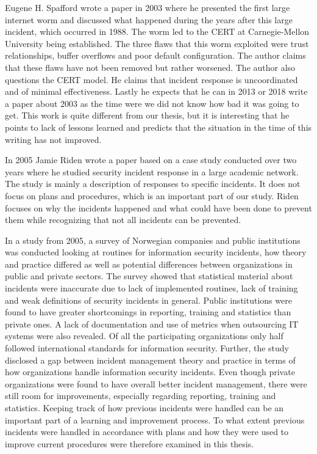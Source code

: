 Eugene H. Spafford \cite{spafford2003failure} wrote a paper in 2003 where he presented the first large internet worm and discussed what happened during the years after this large incident, which occurred in 1988. The worm led to the CERT at Carnegie-Mellon University being established. The three flaws that this worm exploited were trust relationships, buffer overflows and poor default configuration. The author claims that these flaws have not been removed but rather worsened. The author also questions the CERT model. He claims that incident response is uncoordinated and of minimal effectiveness. Lastly he expects that he can in 2013 or 2018 write a paper about 2003 as the time were we did not know how bad it was going to get. This work is quite different from our thesis, but it is interesting that he points to lack of lessons learned and predicts that the situation in the time of this writing has not improved.

In 2005 Jamie Riden \cite{riden2005responding} wrote a paper based on a case study conducted over two years where he studied security incident response in a large academic network. The study is mainly a description of responses to specific incidents. It does not focus on plans and procedures, which is an important part of our study. Riden focuses on why the incidents happened and what could have been done to prevent them while recognizing that not all incidents can be prevented.

In a study from 2005\cite{brage}, a survey of Norwegian companies and public institutions was conducted looking at routines for information security incidents, how theory and practice differed as well as potential differences between organizations in public and private sectors. The survey showed that statistical material about incidents were inaccurate due to lack of implemented routines, lack of training and weak definitions of security incidents in general. Public institutions were found to have greater shortcomings in reporting, training and statistics than private ones. A lack of documentation and use of metrics when outsourcing IT systems were also revealed. Of all the participating organizations only half followed international standards for information security. Further, the study disclosed a gap between incident management theory and practice in terms of how organizations handle information security incidents. Even though private organizations were found to have overall better incident management, there were still room for improvements, especially regarding reporting, training and statistics. Keeping track of how previous incidents were handled can be an important part of a learning and improvement process. To what extent previous incidents were handled in accordance with plans and how they were used to improve current procedures were therefore examined in this thesis.

